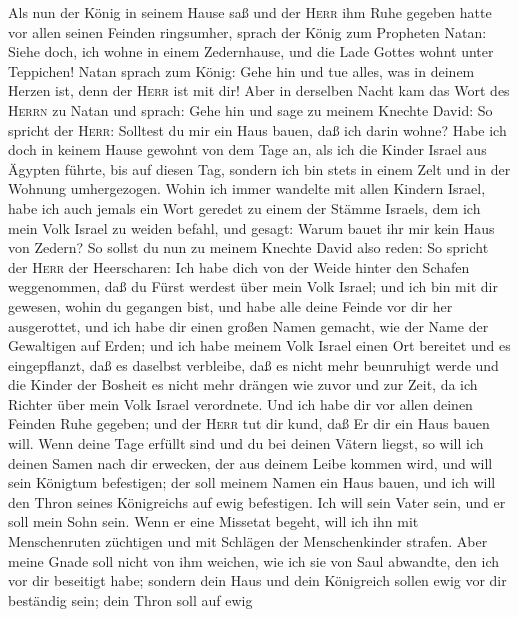  Als nun der König in seinem Hause saß und der
\textsc{Herr} ihm Ruhe gegeben hatte vor allen seinen Feinden
ringsumher,  sprach der König zum Propheten Natan: Siehe
doch, ich wohne in einem Zedernhause, und die Lade Gottes wohnt unter
Teppichen!  Natan sprach zum König: Gehe hin und tue
alles, was in deinem Herzen ist, denn der \textsc{Herr} ist mit dir!
 Aber in derselben Nacht kam das Wort des \textsc{Herrn}
zu Natan und sprach:  Gehe hin und sage zu meinem Knechte
David: So spricht der \textsc{Herr}: Solltest du mir ein Haus bauen, daß
ich darin wohne?  Habe ich doch in keinem Hause gewohnt
von dem Tage an, als ich die Kinder Israel aus Ägypten führte, bis auf
diesen Tag, sondern ich bin stets in einem Zelt und in der Wohnung
umhergezogen.  Wohin ich immer wandelte mit allen Kindern
Israel, habe ich auch jemals ein Wort geredet zu einem der Stämme
Israels, dem ich mein Volk Israel zu weiden befahl, und gesagt: Warum
bauet ihr mir kein Haus von Zedern?  So sollst du nun zu
meinem Knechte David also reden: So spricht der \textsc{Herr} der
Heerscharen: Ich habe dich von der Weide hinter den Schafen weggenommen,
daß du Fürst werdest über mein Volk Israel;  und ich bin
mit dir gewesen, wohin du gegangen bist, und habe alle deine Feinde vor
dir her ausgerottet, und ich habe dir einen großen Namen gemacht, wie
der Name der Gewaltigen auf Erden;  und ich habe meinem
Volk Israel einen Ort bereitet und es eingepflanzt, daß es daselbst
verbleibe, daß es nicht mehr beunruhigt werde und die Kinder der Bosheit
es nicht mehr drängen wie zuvor und zur Zeit, da ich Richter über mein
Volk Israel verordnete.  Und ich habe dir vor allen
deinen Feinden Ruhe gegeben; und der \textsc{Herr} tut dir kund, daß Er
dir ein Haus bauen will.  Wenn deine Tage erfüllt sind
und du bei deinen Vätern liegst, so will ich deinen Samen nach dir
erwecken, der aus deinem Leibe kommen wird, und will sein Königtum
befestigen;  der soll meinem Namen ein Haus bauen, und
ich will den Thron seines Königreichs auf ewig befestigen.
 Ich will sein Vater sein, und er soll mein Sohn sein.
Wenn er eine Missetat begeht, will ich ihn mit Menschenruten züchtigen
und mit Schlägen der Menschenkinder strafen.  Aber meine
Gnade soll nicht von ihm weichen, wie ich sie von Saul abwandte, den ich
vor dir beseitigt habe;  sondern dein Haus und dein
Königreich sollen ewig vor dir beständig sein; dein Thron soll auf ewig
